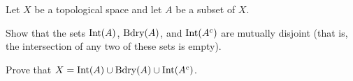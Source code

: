 \item Let $X$ be a topological space and let $A$ be a subset of $X$. 
\ba
\item Show that the sets $\text{Int}(A)$, $\text{Bdry}(A)$, and $\text{Int}(A^c)$ are mutually disjoint (that is, the intersection of any two of these sets is empty).

\item Prove that $X = \text{Int}(A) \cup \text{Bdry}(A) \cup \text{Int}(A^c)$.

\ea

\begin{comment}

\ExerciseSolution 

\ba
\item We take each intersection in turn.
\begin{itemize}
\item Suppose $x \in (\Int(A) \cap \Bdry(A))$. Since $x \in \Int(A)$, there exists an open set $O$ such that $x \in O \subseteq A$. So $O \cap (X \setminus A) = \emptyset$. But $x \in \Bdry(A)$, and so $O$ must intersect $X \setminus A$. This contradiction allows us to conclude that $\Int(A) \cap \Bdry(A) = \emptyset$. 

\item Suppose $x \in \Int(A) \cap \Int(A^c)$. Since $x \in \Int(A)$, there exists an open set $O$ such that $x \in O \subseteq A$. So $O \cap (X \setminus A) = \emptyset$. Also, $x \in \Int(A^c)$ and so there is an open set $O'$ such that $x \in O' \subseteq A^c$. But this makes $x \in A$ and $x \in A^c$, a contradiction. We conclude that $\Int(A) \cap \Int(A^c) = \emptyset$. 

\item Suppose $x \in \Bdry(A) \cap \Int(A^c)$. The fact that $x \in \Int(A^c)$ means that there is an open set $O$ such that $x \in O \subseteq(A^c)$. But then $O \cap A = \emptyset$, which contradicts that fact that $x \in \Bdry(A)$. We conclude that $\Bdry(A) \cap \Int(A^c) = \emptyset$.

\end{itemize}

\item We prove that $X = \Int(A) \cup \Bdry(A) \cup \Int(A^c)$ by demonstrating the containment in both directions. Since $\Int(A)$, $\Bdry(A)$, and $\Int(A^c)$ are all subsets of $X$, we have that $\Int(A) \cup \Bdry(A) \cup \Int(A^c) \subseteq X$. For the reverse containment, let $x \in X$. If $x \in \Int(A)$ or $x \in \Int(A^c)$, we are done. So assume $x \notin \Int(A) \cup \Int(A^c)$. We will show that $x \in \Bdry(A)$. Since $x \notin \Int(A)$, no open set containing $x$ can be entirely contained in $A$. Similarly, xince $x \notin \Int(A^c)$, no open set containing $x$ can be entirely contained in $A^c$. Therefore, every open set containing $x$ must contain a point in $A$ and a point in $A^c$. Thus, $x \in \Bdry(A)$. We conclude that $X \subseteq  \Int(A) \cup \Bdry(A) \cup \Int(A^c)$. The two containments demonstrate that $X =  \Int(A) \cup \Bdry(A) \cup \Int(A^c)$. 

\ea

\end{comment}

